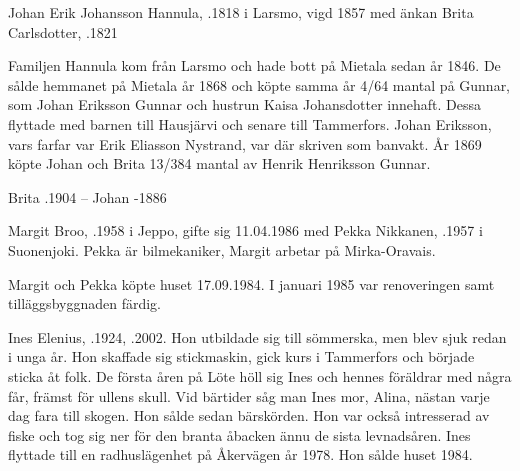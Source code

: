Johan Erik Johansson Hannula, .1818 i Larsmo, vigd 1857 med änkan Brita Carlsdotter, .1821
\begin{jhchildren}
  \item {}
  \item {}
  \item {}
  \item {}
  \item {}
\end{jhchildren}
Familjen Hannula kom från Larsmo och hade bott på Mietala sedan år 1846. De sålde hemmanet på Mietala år 1868 och köpte samma år 4/64 mantal på Gunnar, som Johan Eriksson Gunnar och hustrun Kaisa Johansdotter innehaft. Dessa flyttade med barnen till Hausjärvi och senare till Tammerfors. Johan Eriksson, vars farfar var Erik Eliasson Nystrand, var där skriven som banvakt. År 1869 köpte Johan och Brita 13/384 mantal av Henrik Henriksson Gunnar.

Brita .1904  --  Johan -1886




Margit Broo, .1958 i Jeppo, gifte sig 11.04.1986 med Pekka Nikkanen, .1957 i Suonenjoki. Pekka är bilmekaniker, Margit arbetar på Mirka-Oravais.
\begin{jhchildren}
  \item {}
  \item {}
\end{jhchildren}
Margit och Pekka köpte huset 17.09.1984. I januari 1985 var renoveringen samt tilläggsbyggnaden färdig.


Ines Elenius, .1924, .2002. Hon utbildade sig till sömmerska, men blev sjuk redan i unga år. Hon skaffade sig stickmaskin, gick kurs i Tammerfors och började sticka åt folk. De första åren på Löte höll sig Ines och hennes föräldrar med några får, främst för ullens skull.
Vid bärtider såg man Ines mor, Alina, nästan varje dag fara till skogen. Hon sålde sedan bärskörden. Hon var också intresserad av fiske och tog sig ner för den branta åbacken ännu de sista levnadsåren. Ines flyttade till en radhuslägenhet på Åkervägen år 1978. Hon sålde huset 1984.


